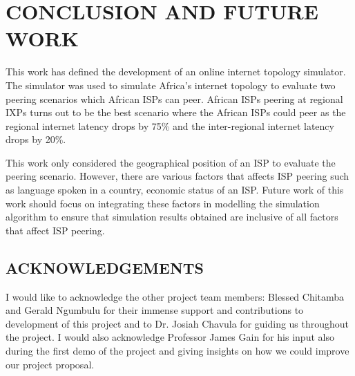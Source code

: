 \section{CONCLUSION AND FUTURE WORK}\label{sec:conclusion}
This work has defined the development of an online internet topology simulator. The simulator was used to simulate Africa's internet topology to evaluate two peering scenarios which African ISPs can peer. African ISPs peering at regional IXPs turns out to be the best scenario where the African ISPs could peer as the regional internet latency drops by 75\% and the inter-regional internet latency drops by 20\%. 

This work only considered the geographical position of an ISP to evaluate the peering scenario. However, there are various factors that affects ISP peering such as language spoken in a country, economic status of an ISP. Future work of this work should focus on integrating these factors in modelling the simulation algorithm to ensure that simulation results obtained are inclusive of all factors that affect ISP peering. 

\subsection{ACKNOWLEDGEMENTS}
I would like to acknowledge the other project team members: Blessed Chitamba and Gerald Ngumbulu for their immense support and contributions to development of this project and to Dr. Josiah Chavula for guiding us throughout the project. I would also acknowledge Professor James Gain for his input also during the first demo of the project and giving insights on how we could improve our project proposal.   



